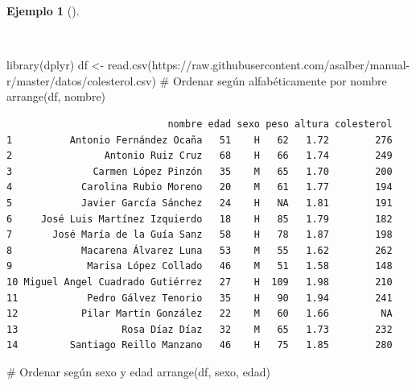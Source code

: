 \documentclass[
  spanish,
  a4paper,
]{scrreport}
\newenvironment{Shaded}{\begin{snugshade}}{\end{snugshade}}
\newcommand{\CommentTok}[1]{\textcolor[rgb]{0.37,0.37,0.37}{#1}}
\newcommand{\FunctionTok}[1]{\textcolor[rgb]{0.28,0.35,0.67}{#1}}
\newcommand{\NormalTok}[1]{\textcolor[rgb]{0.00,0.23,0.31}{#1}}
\newcommand{\OtherTok}[1]{\textcolor[rgb]{0.00,0.23,0.31}{#1}}
\newcommand{\StringTok}[1]{\textcolor[rgb]{0.13,0.47,0.30}{#1}}
\theoremstyle{definition}
\theoremstyle{definition}
\newtheorem{example}{Ejemplo}[chapter]
\theoremstyle{remark}
\begin{document}
\begin{example}[]\protect\hypertarget{exm-arrange}{}\label{exm-arrange}

~

\begin{Shaded}
\begin{Highlighting}[]
\FunctionTok{library}\NormalTok{(dplyr)}
\NormalTok{df }\OtherTok{\textless{}{-}} \FunctionTok{read.csv}\NormalTok{(}\StringTok{\textquotesingle{}https://raw.githubusercontent.com/asalber/manual{-}r/master/datos/colesterol.csv\textquotesingle{}}\NormalTok{)}
\CommentTok{\# Ordenar según alfabéticamente por nombre}
\FunctionTok{arrange}\NormalTok{(df, nombre)}
\end{Highlighting}
\end{Shaded}

\begin{verbatim}
                            nombre edad sexo peso altura colesterol
1          Antonio Fernández Ocaña   51    H   62   1.72        276
2                Antonio Ruiz Cruz   68    H   66   1.74        249
3              Carmen López Pinzón   35    M   65   1.70        200
4            Carolina Rubio Moreno   20    M   61   1.77        194
5            Javier García Sánchez   24    H   NA   1.81        191
6     José Luis Martínez Izquierdo   18    H   85   1.79        182
7       José María de la Guía Sanz   58    H   78   1.87        198
8            Macarena Álvarez Luna   53    M   55   1.62        262
9             Marisa López Collado   46    M   51   1.58        148
10 Miguel Angel Cuadrado Gutiérrez   27    H  109   1.98        210
11            Pedro Gálvez Tenorio   35    H   90   1.94        241
12           Pilar Martín González   22    M   60   1.66         NA
13                  Rosa Díaz Díaz   32    M   65   1.73        232
14         Santiago Reillo Manzano   46    H   75   1.85        280
\end{verbatim}

\begin{Shaded}
\begin{Highlighting}[]
\CommentTok{\# Ordenar según sexo y edad}
\FunctionTok{arrange}\NormalTok{(df, sexo, edad)}
\end{Highlighting}
\end{Shaded}


\end{example}
\end{document}
